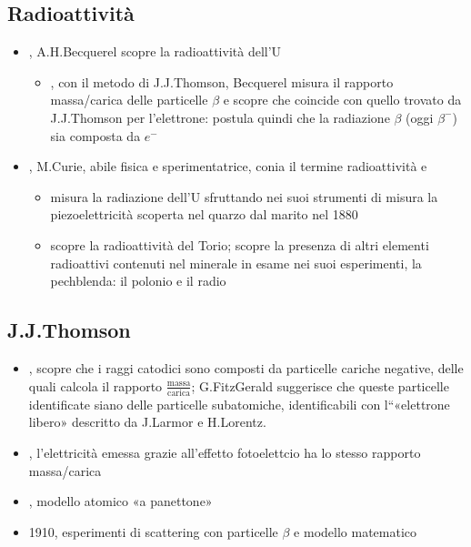 \documentclass[letterpaper,10pt,italian]{jupyterBook}
\begin{document}
\subsection{Radioattività}
\label{\detokenize{ch/modern/intro-radioactivity:id1}}\begin{itemize}
\item {} 
, A.H.Becquerel scopre la radioattività dell’U
\begin{itemize}
\item {} 
, con il metodo di J.J.Thomson, Becquerel misura il rapporto massa/carica delle particelle \(\beta\) e scopre che coincide con quello trovato da J.J.Thomson per l’elettrone: postula quindi che la radiazione \(\beta\) (oggi \(\beta^-\)) sia composta da \(e^-\)

\end{itemize}

\item {} 
, M.Curie, abile fisica e sperimentatrice, conia il termine radioattività e
\begin{itemize}
\item {} 
\sphinxAtStartPar
misura la radiazione dell’U sfruttando nei suoi strumenti di misura la piezoelettricità scoperta nel quarzo dal marito nel 1880

\item {} 
\sphinxAtStartPar
scopre la radioattività del Torio; scopre la presenza di altri elementi radioattivi contenuti nel minerale in esame nei suoi esperimenti, la pechblenda: il polonio e il radio

\end{itemize}

\end{itemize}


\subsection{J.J.Thomson}
\label{\detokenize{ch/modern/intro-radioactivity:j-j-thomson}}\begin{itemize}
\item {} 
, scopre che i raggi catodici sono composti da particelle cariche negative, delle quali calcola il rapporto \(\frac{\text{massa}}{\text{carica}}\); G.FitzGerald suggerisce che queste particelle identificate siano delle particelle sub\sphinxhyphen{}atomiche, identificabili con l“«elettrone libero» descritto da J.Larmor e H.Lorentz.

\item {} 
, l’elettricità emessa grazie all’effetto fotoelettcio ha lo stesso rapporto massa/carica

\item {} 
, modello atomico «a panettone»

\item {} 
\sphinxhyphen{}1910, esperimenti di scattering con particelle \(\beta\) e modello matematico

\end{itemize}
\end{document}
